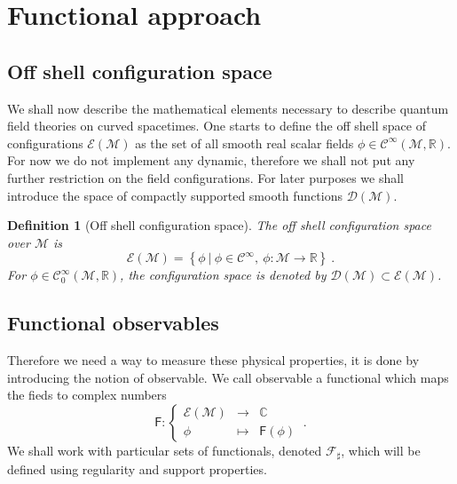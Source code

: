 \documentclass[11pt]{book}
\newcommand{\Ccal}{\mathcal{C}}
\newcommand{\Dcal}{\mathcal{D}}
\newcommand{\Ecal}{\mathcal{E}}
\newcommand{\Fcal}{\mathcal{F}}
\newcommand{\Mcal}{\mathcal{M}}
\newcommand{\Cbb}{\mathbb{C}}
\newcommand{\Rbb}{\mathbb{R}}
\newcommand{\Fsf}{\mathsf{F}}
\theoremstyle{break}
\newtheorem{definition}{Definition}
\begin{document}
\section{Functional approach}

\subsection{Off shell configuration space}

We shall now describe the mathematical elements necessary to describe quantum field theories on curved spacetimes. One starts to define the off shell space of configurations $\Ecal(\Mcal)$ as the set of all smooth real scalar fields $\phi \in \Ccal^\infty\left(\Mcal,\Rbb\right)$. For now we do not implement any dynamic, therefore we shall not put any further restriction on the field configurations. For later purposes we shall introduce the space of compactly supported smooth functions $\Dcal(\Mcal)$.\par%
%
\begin{definition}[Off shell configuration space]
The off shell configuration space over $\Mcal$ is 
%
\begin{equation*}
\Ecal(\Mcal) = \left\{ \phi \ \bigg| \ \phi \in \Ccal^\infty, \  \phi : \Mcal \to \Rbb \right\} \ .
\end{equation*}
%
For $\phi \in \Ccal^\infty_0(\Mcal,\Rbb)$, the configuration space is denoted by $\Dcal(\Mcal) \subset \Ecal(\Mcal)$.
\end{definition}


\subsection{Functional observables}

Therefore we need a way to measure these physical properties, it is done by introducing the notion of observable. We call observable a functional which maps the fieds to complex numbers%
%
\begin{equation*}
\Fsf : \left\{
\begin{array}{ccc}
\Ecal(\Mcal) & \to     & \Cbb \\
\phi  & \mapsto & \Fsf(\phi)
\end{array}
\right. \ .
\end{equation*}
%
We shall work with particular sets of functionals, denoted $\Fcal_\sharp$, which will be defined using regularity and support properties. \par%
\end{document}
